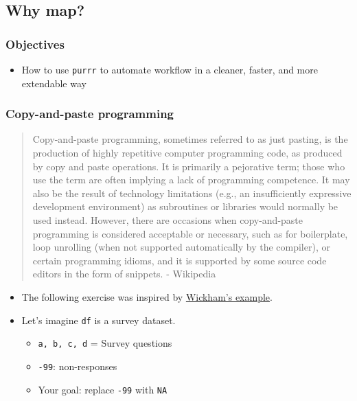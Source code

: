 \documentclass[
]{book}
\providecommand{\tightlist}{%
  \setlength{\itemsep}{0pt}\setlength{\parskip}{0pt}}
\begin{document}
\hypertarget{why-map}{%
\subsection{Why map?}\label{why-map}}

\hypertarget{objectives}{%
\subsubsection{Objectives}\label{objectives}}

\begin{itemize}
\tightlist
\item
  How to use \texttt{purrr} to automate workflow in a cleaner, faster, and more extendable way
\end{itemize}

\hypertarget{copy-and-paste-programming}{%
\subsubsection{Copy-and-paste programming}\label{copy-and-paste-programming}}

\begin{quote}
Copy-and-paste programming, sometimes referred to as just pasting, is the production of highly repetitive computer programming code, as produced by copy and paste operations. It is primarily a pejorative term; those who use the term are often implying a lack of programming competence. It may also be the result of technology limitations (e.g., an insufficiently expressive development environment) as subroutines or libraries would normally be used instead. However, there are occasions when copy-and-paste programming is considered acceptable or necessary, such as for boilerplate, loop unrolling (when not supported automatically by the compiler), or certain programming idioms, and it is supported by some source code editors in the form of snippets. - Wikipedia
\end{quote}

\begin{itemize}
\item
  The following exercise was inspired by \href{http://adv-r.had.co.nz/Functional-programming.html}{Wickham's example}.
\item
  Let's imagine \texttt{df} is a survey dataset.

  \begin{itemize}
  \item
    \texttt{a,\ b,\ c,\ d} = Survey questions
  \item
    \texttt{-99}: non-responses
  \item
    Your goal: replace \texttt{-99} with \texttt{NA}
  \end{itemize}
\end{itemize}
\end{document}
